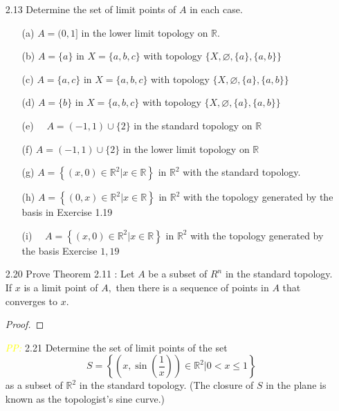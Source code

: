 \documentclass[12pt]{article}
\newcommand{\pp}{\textit{\textcolor{yellow}{PP: }}}%
\begin{document}
\begin{enumerate}
	
	
	\item[2.13] Determine the set of limit points of $ A $ in each case.
		\begin{enumerate}
			\item[(a)] $A=(0,1]$ in the lower limit topology on $\mathbb{R}$.
			\item[(b)] $A=\{a\}$ in $X=\{a, b, c\}$ with topology $\{X, \varnothing,\{a\},\{a, b\}\}$
			\item[(c)] $A=\{a, c\}$ in $X=\{a, b, c\}$ with topology $\{X, \varnothing,\{a\},\{a, b\}\}$
			\item[(d)] $A=\{b\}$ in $X=\{a, b, c\}$ with topology $\{X, \varnothing,\{a\},\{a, b\}\}$
			\item[(e)] $\quad A=(-1,1) \cup\{2\}$ in the standard topology on $\mathbb{R}$
			\item[(f)] $A=(-1,1) \cup\{2\}$ in the lower limit topology on $\mathbb{R}$
			\item[(g)] $A=\left\{(x, 0) \in \mathbb{R}^{2} | x \in \mathbb{R}\right\}$ in $\mathbb{R}^{2}$ with the standard topology.
			\item[(h)] $A=\left\{(0, x) \in \mathbb{R}^{2} | x \in \mathbb{R}\right\}$ in $\mathbb{R}^{2}$ with the topology generated by the basis in Exercise 1.19
			\item[(i)] $\quad A=\left\{(x, 0) \in \mathbb{R}^{2} | x \in \mathbb{R}\right\}$ in $\mathbb{R}^{2}$ with the topology generated by the basis Exercise $1,19$
		\end{enumerate}
	\item[2.20] Prove Theorem 2.11 : Let $A$ be a subset of $R^{n}$ in the standard topology. If $x$ is a limit point of $A,$ then there is a sequence of points in $A$ that converges to $x$.
	\begin{proof}
		
	\end{proof}
	\item[\pp2.21] Determine the set of limit points of the set
	$$
	S=\left\{\left(x, \sin \left(\frac{1}{x}\right)\right) \in \mathbb{R}^{2} | 0<x \leq 1\right\}
	$$
	as a subset of $\mathbb{R}^{2}$ in the standard topology. (The closure of $S$ in the plane is known as the topologist's sine curve.)
	
\end{enumerate}
\end{document}
